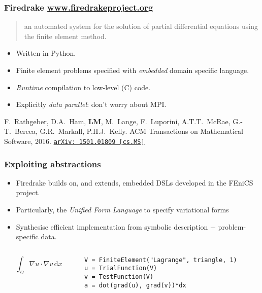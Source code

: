 \documentclass[presentation]{beamer}
\newcommand{\arxivlink}[2]{%
  \href{http://www.arxiv.org/abs/#1}%
  {\texttt{arXiv:\,#1\,[#2]}}%
}
\begin{document}
\begin{frame}
  \frametitle{Firedrake \url{www.firedrakeproject.org}}

  \begin{quote}
    {\normalfont [\ldots]} an automated system for the solution of partial
    differential equations using the finite element method.
  \end{quote}

  \begin{itemize}
  \item Written in Python.
  \item Finite element problems specified with \emph{embedded} domain
    specific language.
  \item \emph{Runtime} compilation to low-level (C) code.
  \item Explicitly \emph{data parallel}: don't worry about MPI.
  \end{itemize}

  \begin{flushright}
    {\scriptsize F.~Rathgeber, D.A.~Ham, \textbf{LM}, M.~Lange,
      F.~Luporini, A.T.T.~McRae, G.-T.~Bercea, G.R.~Markall,
      P.H.J.~Kelly. ACM Transactions on Mathematical Software,
      2016. \arxivlink{1501.01809}{cs.MS}}
  \end{flushright}
\end{frame}

\begin{frame}[fragile]
  \frametitle{Exploiting abstractions}
  \begin{itemize}
  \item Firedrake builds on, and extends, embedded DSLs developed in
    the FEniCS project.
  \item Particularly, the \emph{Unified Form Language} \parencite{Alnaes:2014} to
    specify variational forms
  \item Synthesise efficient implementation from symbolic description
    + problem-specific data.
  \end{itemize}
  \begin{columns}
    \begin{column}{0.4\textwidth}
      \begin{equation*}
        \int_\Omega \nabla u \cdot \nabla v\,\text{d}x
      \end{equation*}
    \end{column}
    \hspace{-3em}
    \begin{column}{0.6\textwidth}
\begin{verbatim}
V = FiniteElement("Lagrange", triangle, 1)
u = TrialFunction(V)
v = TestFunction(V)
a = dot(grad(u), grad(v))*dx
\end{verbatim}
    \end{column}
  \end{columns}
\end{frame}
\end{document}
